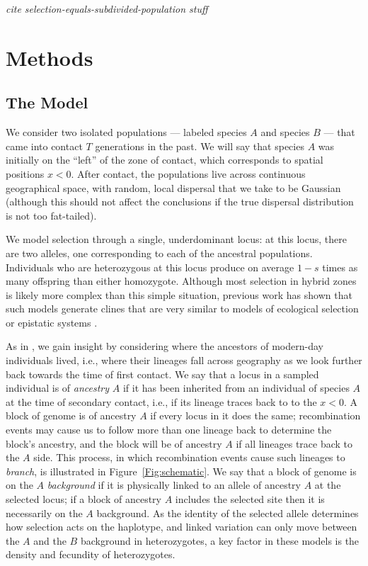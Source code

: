 \documentclass[11pt,letterpaper]{article}
\newcommand{\plr}[1]{{\em \color{blue} #1}}
\begin{document}


\plr{cite selection-equals-subdivided-population stuff}

\section*{Methods}

\subsection*{The Model}

We consider two isolated populations
--- labeled species $A$ and species $B$ ---   %
that came into contact $T$ generations in the past.  
We will say that species $A$ was initially on the ``left'' of the zone of contact, which corresponds to spatial positions $x<0$.  
After contact, the populations live across continuous geographical space,
with random, local dispersal that we take to be Gaussian
(although this should not affect the conclusions if the true dispersal distribution is not too fat-tailed).

We model selection through a single, underdominant locus:
at this locus, there are two alleles, one corresponding to each of the ancestral populations.
Individuals who are heterozygous at this locus produce on average $1-s$ times as many offspring than either homozygote.
Although most selection in hybrid zones is likely more complex than this simple situation, 
previous work has shown that such models generate clines that are very similar to models of ecological selection or epistatic systems \citep{Kruuk1999,Barton2000a}.

As in \citet{Sedghifar2015}, 
we gain insight by considering where the ancestors of modern-day individuals lived,
i.e., where their lineages fall across geography as we look further back towards the time of first contact.
We say that a locus in a sampled individual is of \emph{ancestry} $A$ if it has been inherited from an individual of species $A$ at the time of secondary contact,
i.e., if its lineage traces back to to the $x<0$.
A block of genome is of ancestry $A$ if every locus in it does the same;
recombination events may cause us to follow more than one lineage back to determine the block's ancestry,
and the block will be of ancestry $A$ if all lineages trace back to the $A$ side.
This process, in which recombination events cause such lineages to \emph{branch},
is illustrated in Figure~\ref{Fig:schematic}.
We say that a block of genome is on the $A$ \emph{background} if it is physically linked to an allele of ancestry $A$ at the selected locus;
if a block of ancestry $A$ includes the selected site then it is necessarily on the $A$ background.
As the identity of the selected allele determines how selection acts on the haplotype,
and linked variation can only move between the $A$ and the $B$ background in heterozygotes,
a key factor in these models is the density and fecundity of heterozygotes.
\end{document}
